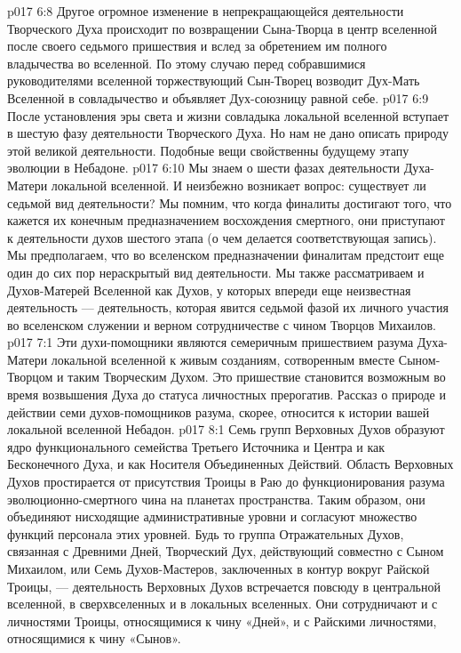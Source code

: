 \vs p017 6:8 \bibnobreakspace {} Другое огромное изменение в непрекращающейся деятельности Творческого Духа происходит по возвращении Сына\hyp{}Творца в центр вселенной после своего седьмого пришествия и вслед за обретением им полного владычества во вселенной. По этому случаю перед собравшимися руководителями вселенной торжествующий Сын\hyp{}Творец возводит Дух\hyp{}Мать Вселенной в совладычество и объявляет Дух\hyp{}союзницу равной себе.
\vs p017 6:9 \bibnobreakspace {} После установления эры света и жизни совладыка локальной вселенной вступает в шестую фазу деятельности Творческого Духа. Но нам не дано описать природу этой великой деятельности. Подобные вещи свойственны будущему этапу эволюции в Небадоне.
\vs p017 6:10 \bibnobreakspace {} Мы знаем о шести фазах деятельности Духа\hyp{}Матери локальной вселенной. И неизбежно возникает вопрос: существует ли седьмой вид деятельности? Мы помним, что когда финалиты достигают того, что кажется их конечным предназначением восхождения смертного, они приступают к деятельности духов шестого этапа (о чем делается соответствующая запись). Мы предполагаем, что во вселенском предназначении финалитам предстоит еще один до сих пор нераскрытый вид деятельности. Мы также рассматриваем и Духов\hyp{}Матерей Вселенной как Духов, у которых впереди еще неизвестная деятельность --- деятельность, которая явится седьмой фазой их личного участия во вселенском служении и верном сотрудничестве с чином Творцов Михаилов.
\vs p017 7:1 Эти духи\hyp{}помощники являются семеричным пришествием разума Духа\hyp{}Матери локальной вселенной к живым созданиям, сотворенным вместе Сыном\hyp{}Творцом и таким Творческим Духом. Это пришествие становится возможным во время возвышения Духа до статуса личностных прерогатив. Рассказ о природе и действии семи духов\hyp{}помощников разума, скорее, относится к истории вашей локальной вселенной Небадон.
\vs p017 8:1 Семь групп Верховных Духов образуют ядро функционального семейства Третьего Источника и Центра и как Бесконечного Духа, и как Носителя Объединенных Действий. Область Верховных Духов простирается от присутствия Троицы в Раю до функционирования разума эволюционно\hyp{}смертного чина на планетах пространства. Таким образом, они объединяют нисходящие административные уровни и согласуют множество функций персонала этих уровней. Будь то группа Отражательных Духов, связанная с Древними Дней, Творческий Дух, действующий совместно с Сыном Михаилом, или Семь Духов\hyp{}Мастеров, заключенных в контур вокруг Райской Троицы, --- деятельность Верховных Духов встречается повсюду в центральной вселенной, в сверхвселенных и в локальных вселенных. Они сотрудничают и с личностями Троицы, относящимися к чину «Дней», и с Райскими личностями, относящимися к чину «Сынов».
